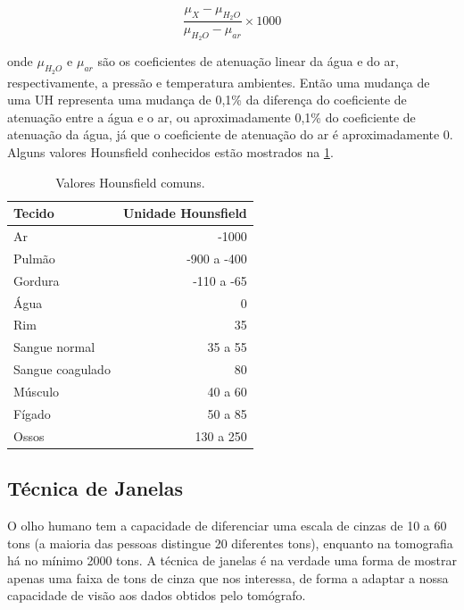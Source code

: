 \begin{equation}
	\frac{\mu_X-\mu_{H_2O}}{\mu_{H_2O}-\mu_{ar}}\times 1000
	\label{equa:hounsfield}
\end{equation}

onde $\mu_{H_2O}$ e $\mu_{ar}$ são os coeficientes de atenuação linear da água e do ar, respectivamente, a pressão e temperatura ambientes. Então uma mudança de uma UH representa uma mudança de 0,1\% da diferença do coeficiente de atenuação entre a água e o ar, ou aproximadamente 0,1\% do coeficiente de atenuação da água, já que o coeficiente de atenuação do ar é aproximadamente 0. Alguns valores Hounsfield conhecidos estão mostrados na \ref{tab:hounsfield}.

\begin{table}
 \label{tab:hounsfield}
 \caption{Valores Hounsfield comuns.}
 \cite{oliveira} %
 \begin{center}
 \begin{tabular}{|l|r|}
 \hline
 	\textbf{Tecido} & \textbf{Unidade Hounsfield} \\ \hline
 	Ar & -1000 \\ \hline
 	Pulmão & -900 a -400 \\ \hline
 	Gordura & -110 a -65 \\ \hline
 	Água & 0 \\ \hline
 	Rim & 35 \\ \hline
 	Sangue normal & 35 a 55 \\ \hline
 	Sangue coagulado & 80 \\ \hline
 	Músculo & 40 a 60 \\ \hline
 	Fígado & 50 a 85 \\ \hline
 	Ossos & 130 a 250 \\
 \hline
 \end{tabular}
 \end{center}
\end{table}

\subsection{Técnica de Janelas}

O olho humano tem a capacidade de diferenciar uma escala de cinzas de 10 a 60 tons (a maioria das pessoas distingue 20 diferentes tons), enquanto na tomografia há no mínimo 2000 tons. A técnica de janelas é na verdade uma forma de mostrar apenas uma faixa de tons de cinza que nos interessa, de forma a adaptar a nossa capacidade de visão aos dados obtidos pelo tomógrafo.

